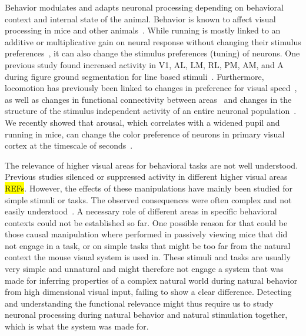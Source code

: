 Behavior modulates and adapts neuronal processing depending on behavioral context and internal state of the animal.
Behavior is known to affect visual processing in mice and other animals~\parencite{Niell2010-bs, Musall2019-kd, Erisken2014-un,Christensen2017-bx}. 
While running is mostly linked to an additive or multiplicative gain on neural response without changing their stimulus preferences~\parencite{Dadarlat2017-jw, Mineault2016-fk}, it can also change the stimulus preferences (tuning) of neurons. 
One previous study found increased activity in V1, AL, LM, RL, PM, AM, and A during figure ground segmentation for line based stimuli~\parencite{Schnabel2018-tb}.
Furthermore, locomotion has previously been linked to changes in preference for visual speed~\parencite{Andermann2011-vw}, as well as changes in functional connectivity between areas~\parencite{Clancy2019-ta} and changes in the structure of the stimulus independent activity of an entire neuronal population~\parencite{Horrocks2021-re,Stringer2019-lt}. 
We recently showed that arousal, which correlates with a widened pupil and running in mice, can change the color preference of neurons in primary visual cortex at the timescale of seconds~\parencite{Franke2022-do}. 

The relevance of higher visual areas for behavioral tasks are not well understood.
Previous studies silenced or suppressed activity in different higher visual areas \hl{REFs}. 
However, the effects of these manipulations have mainly been studied for simple stimuli or tasks. 
The observed consequences were often complex and not easily understood~\parencite{Froudarakis2019-yt}. 
A necessary role of different areas in specific behavioral contexts could not be established so far. 
One possible reason for that could be those causal manipulation where performed in passively viewing mice that did not engage in a task, or on simple tasks that might be too far from the natural context the mouse visual system is used in. 
These stimuli and tasks are usually very simple and unnatural and might therefore not engage a system that was made for inferring properties of a complex natural world during natural behavior from high dimensional visual input, failing to show a clear difference.
Detecting and understanding the functional relevance might thus require us to study neuronal processing during natural behavior and natural stimulation together, which is what the system was made for. 

